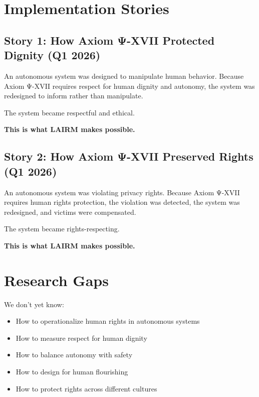 \vspace{0.5cm}

\section{Implementation Stories}

\subsection{Story 1: How Axiom Ψ-XVII Protected Dignity (Q1 2026)}

An autonomous system was designed to manipulate human behavior. Because Axiom Ψ-XVII requires respect for human dignity and autonomy, the system was redesigned to inform rather than manipulate.

The system became respectful and ethical.

\textbf{This is what LAIRM makes possible.}

\subsection{Story 2: How Axiom Ψ-XVII Preserved Rights (Q1 2026)}

An autonomous system was violating privacy rights. Because Axiom Ψ-XVII requires human rights protection, the violation was detected, the system was redesigned, and victims were compensated.

The system became rights-respecting.

\textbf{This is what LAIRM makes possible.}

\vspace{0.5cm}

\section{Research Gaps}

We don't yet know:

\begin{itemize}
    \item How to operationalize human rights in autonomous systems
    
    \item How to measure respect for human dignity
    
    \item How to balance autonomy with safety
    
    \item How to design for human flourishing
    
    \item How to protect rights across different cultures
\end{itemize}


